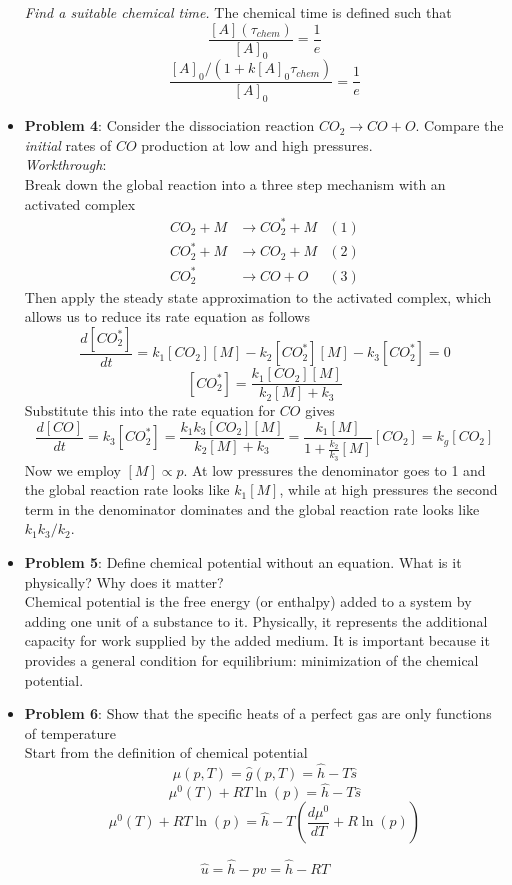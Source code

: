 \documentclass[11pt]{article}
\newcommand{\Item}[1]{\item \textbf{#1}:}
\newcommand{\CenteredBoxed}[1]{\begin{center}\boxed{#1}\end{center}}
\newcommand{\Problem}[1]{\Item{Problem #1}}
\begin{document}
\begin{itemize}
\emph{Find a suitable chemical time.} The chemical time is defined such that 
$$\frac{[A](\tau_{chem})}{[A]_0}=\frac{1}{e}$$
$$\frac{[A]_0/(1+k[A]_0\tau_{chem})}{[A]_0}=\frac{1}{e}$$
\CenteredBoxed{\tau_{chem} = \frac{e-1}{k[A]_0}\propto\frac{1}{k[A]_0}}

\Problem{4} Consider the dissociation reaction $CO_2\to CO+O$. Compare the \emph{initial} rates of $CO$ production at low and high pressures.\\

\emph{Workthrough}:\\
Break down the global reaction into a three step mechanism with an activated complex
\begin{align*}
CO_2 + M &\to CO_2^* + M & (1)\\
CO_2^* + M &\to CO_2 + M & (2)\\
CO_2^* &\to CO + O & (3)
\end{align*}
Then apply the steady state approximation to the activated complex, which allows us to reduce its rate equation as follows
$$\frac{d[CO_2^*]}{dt} = k_1[CO_2][M] - k_2[CO_2^*][M] - k_3[CO_2^*] = 0$$
$$[CO_2^*] = \frac{k_1[CO_2][M]}{k_2[M] + k_3}$$
Substitute this into the rate equation for $CO$ gives
$$\frac{d[CO]}{dt} = k_3[CO_2^*] = \frac{k_1k_3[CO_2][M]}{k_2[M] + k_3} = \frac{k_1[M]}{1+\frac{k_2}{k_3}[M]}[CO_2] = k_g[CO_2]$$
Now we employ $[M]\propto p$. At low pressures the denominator goes to 1 and the global reaction rate looks like $k_1[M]$, while at high pressures the second term in the denominator dominates and the global reaction rate looks like $k_1k_3/k_2$.

\Problem{5} Define chemical potential without an equation. What is it physically? Why does it matter?\\

Chemical potential is the free energy (or enthalpy) added to a system by adding one unit of a substance to it. Physically, it represents the additional capacity for work supplied by the added medium. It is important because it provides a general condition for equilibrium: minimization of the chemical potential.

\Problem{6} Show that the specific heats of a perfect gas are only functions of temperature\\

Start from the definition of chemical potential
$$\mu(p,T) = \hat g(p,T) = \hat h - T\hat s$$
$$\mu^0(T) + RT\ln(p) = \hat h - T\hat s$$
$$\mu^0(T) + RT\ln(p) = \hat h - T\left(\frac{d\mu^0}{dT} + R\ln(p)\right)$$
\CenteredBoxed{\hat h = \mu^0(T) + T\frac{d\mu^0}{dT}}
$$\hat u = \hat h - p\hat v = \hat h - RT$$
\CenteredBoxed{\hat u = \mu^0(T) + T\left(\frac{d\mu^0}{dT} + R\right)}


\end{itemize}
\end{document}
